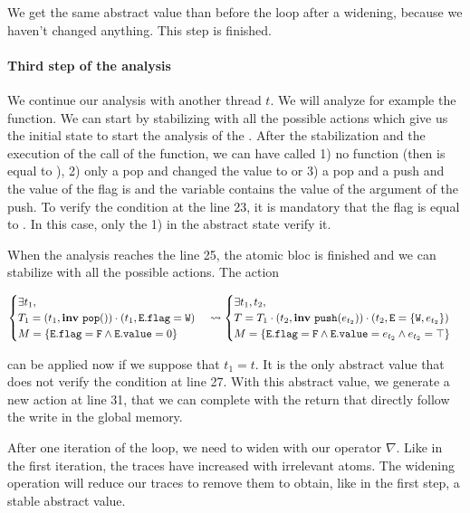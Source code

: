 We get the same abstract value than before the loop after a widening, because we haven't changed anything. This step is finished.








\paragraph{Third step of the analysis} We continue our analysis with another thread $t$. We will analyze for example the  function. We can start by stabilizing with all the possible actions which give us the initial state to start the analysis of the .
After the stabilization and the execution of the call of the function, we can have called 1) no function (then  is equal to ), 2) only a pop and changed the  value to  or 3) a pop and a push and the value of the flag is  and the variable  contains the value of the argument of the push.
To verify the condition at the line 23, it is mandatory that the flag is equal to . In this case, only the 1) in the abstract state verify it. 

When the analysis reaches the line 25, the atomic bloc is finished and we can stabilize with all the possible actions. The action 
\begin{scriptsize}
\[\begin{cases}
	\exists t_1, \\
	T_1 = (t_1, \mathbf{inv}\ \mathtt{pop}())\cdot (t_1, \mathtt{E.flag} = \mathtt{W}) \\
	M = \{\mathtt{E.flag} = \mathtt{F} \wedge \mathtt{E.value} = 0\}
\end{cases} 
\leadsto
\begin{cases}
	\exists t_1, t_2,\\
	T = T_1 \cdot (t_2, \mathbf{inv}\ \mathtt{push}(e_{t_2})) \cdot (t_2, \mathtt{E} = \{\mathtt{W}, e_{t_2}\})\\
	M = \{\mathtt{E.flag} = \mathtt{F} \wedge \mathtt{E.value} = e_{t_2} \wedge e_{t_2} = \top\}
\end{cases}
\] \end{scriptsize}
can be applied now if we suppose that $t_1 = t$. It is the only abstract value that does not verify the condition at line 27. With this abstract value, we generate a new action at line 31, that we can complete with the return that directly follow the write in the global memory. 

After one iteration of the loop, we need to widen with our operator $\nabla$. Like in the first iteration, the traces have increased with irrelevant atoms. The widening operation will reduce our traces to remove them to obtain, like in the first step, a stable abstract value. 


